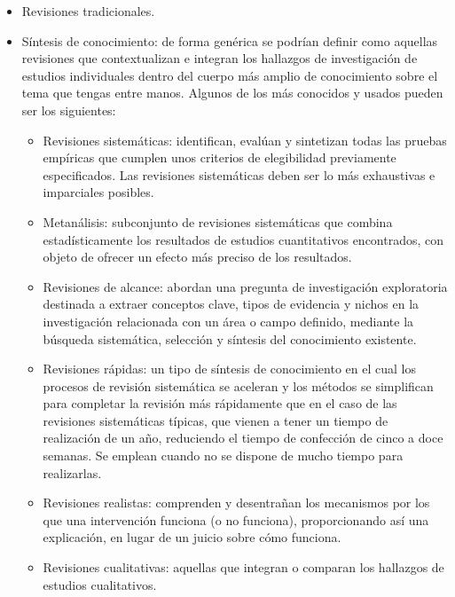 \begin{itemize}
    \item Revisiones tradicionales. 
    \item Síntesis de conocimiento: de forma genérica se podrían definir como aquellas revisiones que contextualizan e integran los hallazgos de investigación de estudios individuales dentro del cuerpo más amplio de conocimiento sobre el tema que tengas entre manos. Algunos de los más conocidos y usados pueden ser los siguientes:
    \begin{itemize}
        \item Revisiones sistemáticas: identifican, evalúan y sintetizan todas las pruebas empíricas que cumplen unos criterios de elegibilidad previamente especificados. Las revisiones sistemáticas deben ser lo más exhaustivas e imparciales posibles.
        
        \item Metanálisis: subconjunto de revisiones sistemáticas que combina estadísticamente los resultados de estudios cuantitativos encontrados, con objeto de ofrecer un efecto más preciso de los resultados.
        
        \item Revisiones de alcance: abordan una pregunta de investigación exploratoria destinada a extraer conceptos clave, tipos de evidencia y nichos en la investigación relacionada con un área o campo definido, mediante la búsqueda sistemática, selección y síntesis del conocimiento existente.
        
        \item Revisiones rápidas: un tipo de síntesis de conocimiento en el cual los procesos de revisión sistemática se aceleran y los métodos se simplifican para completar la revisión más rápidamente que en el caso de las revisiones sistemáticas típicas, que vienen a tener un tiempo de realización de un año, reduciendo el tiempo de confección de cinco a doce semanas. Se emplean cuando no se dispone de mucho tiempo para realizarlas.
        
        \item Revisiones realistas: comprenden y desentrañan los mecanismos por los que una intervención funciona (o no funciona), proporcionando así una explicación, en lugar de un juicio sobre cómo funciona.

        \item Revisiones cualitativas: aquellas que integran o comparan los hallazgos de estudios cualitativos.


\end{itemize}
\end{itemize}
